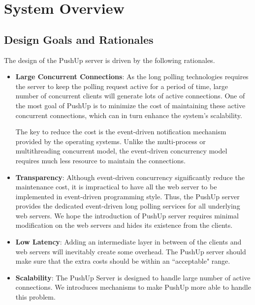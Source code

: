 \section {System Overview\\}

\subsection{Design Goals and Rationales\\}
The design of the PushUp server is driven by the following rationales.
\begin{itemize}
\item {\bf Large Concurrent Connections}:
    As the long polling technologies requires the server to keep the polling
    request active for a period of time, large number of concurrent clients 
    will generate lots of active connections. One of the most goal of PushUp
    is to minimize the cost of maintaining these active concurrent connections,
    which can in turn enhance the system's scalability.
     
    The key to reduce the cost is the event-driven notification mechanism 
    provided by the operating systems. Unlike the multi-process or 
    multithreading concurrent model, the event-driven concurrency model 
    requires much less resource to maintain the connections.

\item {\bf Transparency}: Although event-driven concurrency significantly 
    reduce the maintenance cost, it is impractical to have all the web 
    server to be implemented in event-driven programming style. Thus, the 
    PushUp server provides the dedicated event-driven long polling services
    for all underlying web servers. We hope the introduction of PushUp server
    requires minimal modification on the web servers and hides its existence
    from the clients.

\item {\bf Low Latency}: Adding an intermediate layer in between of the 
    clients and web servers will inevitably create some overhead. 
    The PushUp server should make sure that the extra costs should be within
    an ``acceptable" range.

\item {\bf Scalability}: The PushUp Server is designed to handle large number of
    active connections. We introduces mechanisms to make PushUp more able to
    handle this problem. 

\end{itemize}

